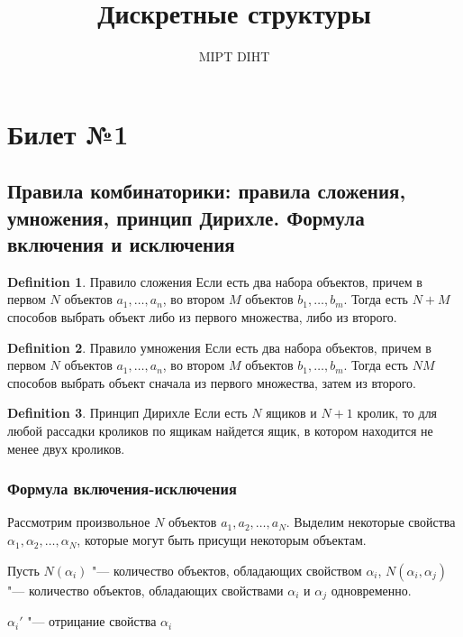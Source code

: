 \documentclass[a4paper]{article}
\title{Дискретные структуры}
\author{MIPT DIHT}
\theoremstyle{plain}
\theoremstyle{remark}
\theoremstyle{definition}
\newtheorem{definition}{Definition}
\begin{document}
\maketitle

\section{Билет №1}
\subsection{Правила комбинаторики: правила сложения, умножения, принцип Дирихле. Формула включения и исключения}

\begin{definition}{Правило сложения}
	\newline
	Если есть два набора объектов, причем в первом $N$ объектов $a_1, \ldots, a_n$, во втором $M$ объектов $b_1, \ldots, b_m$. 
Тогда есть $N+M$ способов выбрать объект либо из первого множества, либо из второго.
\end{definition}

\begin{definition}{Правило умножения}
	\newline
	Если есть два набора объектов, причем в первом $N$ объектов $a_1, \ldots, a_n$, во втором $M$ объектов $b_1, \ldots, b_m$. 
Тогда есть $NM$ способов выбрать объект сначала из первого множества, затем из второго.
\end{definition}

\begin{definition}{Принцип Дирихле}
	\newline
	Если есть $N$ ящиков и $N+1$ кролик, то для любой рассадки кроликов по ящикам найдется ящик, в котором находится не менее двух кроликов.
\end{definition}
\subsubsection{Формула включения-исключения}

Рассмотрим произвольное $N$ объектов $a_1, a_2, \ldots, a_N$. Выделим некоторые свойства $\alpha_1, \alpha_2, \ldots, \alpha_N$, которые могут быть присущи некоторым объектам.

	Пусть $N(\alpha_i)$ "--- количество объектов, обладающих свойством $\alpha_i$, $N(\alpha_i, \alpha_j)$ "--- количество объектов, обладающих свойствами $\alpha_i$ и $\alpha_j$ одновременно.

	$\alpha_i'$ "--- отрицание свойства $\alpha_i$
\end{document}
